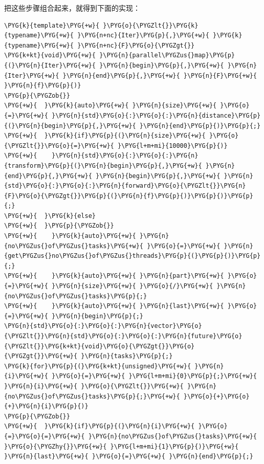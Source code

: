 
把这些步骤组合起来，就得到下面的实现：



\begin{codeblockbg}
\begin{Verbatim}[commandchars=\\\{\},breaklines=true,breakanywhere=true,fontsize=\codefont,xleftmargin=17bp]
\PYG{k}{template}\PYG{+w}{ }\PYG{o}{\PYGZlt{}}\PYG{k}{typename}\PYG{+w}{ }\PYG{n+nc}{Iter}\PYG{p}{,}\PYG{+w}{ }\PYG{k}{typename}\PYG{+w}{ }\PYG{n+nc}{F}\PYG{o}{\PYGZgt{}}
\PYG{k+kt}{void}\PYG{+w}{ }\PYG{n}{parallel\PYGZus{}map}\PYG{p}{(}\PYG{n}{Iter}\PYG{+w}{ }\PYG{n}{begin}\PYG{p}{,}\PYG{+w}{ }\PYG{n}{Iter}\PYG{+w}{ }\PYG{n}{end}\PYG{p}{,}\PYG{+w}{ }\PYG{n}{F}\PYG{+w}{ }\PYG{n}{f}\PYG{p}{)}
\PYG{p}{\PYGZob{}}
\PYG{+w}{  }\PYG{k}{auto}\PYG{+w}{ }\PYG{n}{size}\PYG{+w}{ }\PYG{o}{=}\PYG{+w}{ }\PYG{n}{std}\PYG{o}{:}\PYG{o}{:}\PYG{n}{distance}\PYG{p}{(}\PYG{n}{begin}\PYG{p}{,}\PYG{+w}{ }\PYG{n}{end}\PYG{p}{)}\PYG{p}{;}
\PYG{+w}{  }\PYG{k}{if}\PYG{p}{(}\PYG{n}{size}\PYG{+w}{ }\PYG{o}{\PYGZlt{}}\PYG{o}{=}\PYG{+w}{ }\PYG{l+m+mi}{10000}\PYG{p}{)}
\PYG{+w}{    }\PYG{n}{std}\PYG{o}{:}\PYG{o}{:}\PYG{n}{transform}\PYG{p}{(}\PYG{n}{begin}\PYG{p}{,}\PYG{+w}{ }\PYG{n}{end}\PYG{p}{,}\PYG{+w}{ }\PYG{n}{begin}\PYG{p}{,}\PYG{+w}{ }\PYG{n}{std}\PYG{o}{:}\PYG{o}{:}\PYG{n}{forward}\PYG{o}{\PYGZlt{}}\PYG{n}{F}\PYG{o}{\PYGZgt{}}\PYG{p}{(}\PYG{n}{f}\PYG{p}{)}\PYG{p}{)}\PYG{p}{;}
\PYG{+w}{  }\PYG{k}{else}
\PYG{+w}{  }\PYG{p}{\PYGZob{}}
\PYG{+w}{    }\PYG{k}{auto}\PYG{+w}{ }\PYG{n}{no\PYGZus{}of\PYGZus{}tasks}\PYG{+w}{ }\PYG{o}{=}\PYG{+w}{ }\PYG{n}{get\PYGZus{}no\PYGZus{}of\PYGZus{}threads}\PYG{p}{(}\PYG{p}{)}\PYG{p}{;}
\PYG{+w}{    }\PYG{k}{auto}\PYG{+w}{ }\PYG{n}{part}\PYG{+w}{ }\PYG{o}{=}\PYG{+w}{ }\PYG{n}{size}\PYG{+w}{ }\PYG{o}{/}\PYG{+w}{ }\PYG{n}{no\PYGZus{}of\PYGZus{}tasks}\PYG{p}{;}
\PYG{+w}{    }\PYG{k}{auto}\PYG{+w}{ }\PYG{n}{last}\PYG{+w}{ }\PYG{o}{=}\PYG{+w}{ }\PYG{n}{begin}\PYG{p}{;}
\PYG{n}{std}\PYG{o}{:}\PYG{o}{:}\PYG{n}{vector}\PYG{o}{\PYGZlt{}}\PYG{n}{std}\PYG{o}{:}\PYG{o}{:}\PYG{n}{future}\PYG{o}{\PYGZlt{}}\PYG{k+kt}{void}\PYG{o}{\PYGZgt{}}\PYG{o}{\PYGZgt{}}\PYG{+w}{ }\PYG{n}{tasks}\PYG{p}{;}
\PYG{k}{for}\PYG{p}{(}\PYG{k+kt}{unsigned}\PYG{+w}{ }\PYG{n}{i}\PYG{+w}{ }\PYG{o}{=}\PYG{+w}{ }\PYG{l+m+mi}{0}\PYG{p}{;}\PYG{+w}{ }\PYG{n}{i}\PYG{+w}{ }\PYG{o}{\PYGZlt{}}\PYG{+w}{ }\PYG{n}{no\PYGZus{}of\PYGZus{}tasks}\PYG{p}{;}\PYG{+w}{ }\PYG{o}{+}\PYG{o}{+}\PYG{n}{i}\PYG{p}{)}
\PYG{p}{\PYGZob{}}
\PYG{+w}{  }\PYG{k}{if}\PYG{p}{(}\PYG{n}{i}\PYG{+w}{ }\PYG{o}{=}\PYG{o}{=}\PYG{+w}{ }\PYG{n}{no\PYGZus{}of\PYGZus{}tasks}\PYG{+w}{ }\PYG{o}{\PYGZhy{}}\PYG{+w}{ }\PYG{l+m+mi}{1}\PYG{p}{)}\PYG{+w}{ }\PYG{n}{last}\PYG{+w}{ }\PYG{o}{=}\PYG{+w}{ }\PYG{n}{end}\PYG{p}{;}

\end{Verbatim}
\end{codeblockbg}
